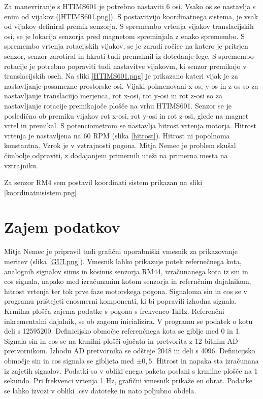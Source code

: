 Za manevriranje s HTIMS601 je potrebno nastaviti 6 osi.
Vsako os se nastavlja s enim od vijakov (\ref{HTIMS601.png}).
S postavitvijo koordinatnega sistema, je vsak od vijakov definiral premik senzorja. 
S spremembo vrtenja vijakov translacijskih osi, se je lokacija senzorja pred magnetom spreminjala z enako spremembo. S spremembo vrtenja rotacijskih vijakov, se je zaradi ročice na katero je pritrjen senzor, senzor zarotiral in hkrati tudi premaknil iz dotedanje lege. S spremembo rotacije je potrebno popraviti tudi nastavitve vijakovm, ki senzor premikajo v translacijskih oseh.
Na sliki \ref{HTIMS601.png} je prikazano kateri vijak je za nastavljanje posamezne prostorske osi. Vijaki poimenovani x-os, y-os in z-os so za nastavljanje translaciijo merjenca, rot x-osi, rot y-osi in rot z-osi so za nastavljanje rotacije premikajoče plošče na vrhu HTIMS601.
Senzor se je posledično ob premiku vijakov rot x-osi, rot y-osi in rot z-osi, glede na magnet vrtel in premikal.
S potenciometrom se nastavlja hitrost vrtenja motorja.
Hitrost vrtenja je nastavljena na 60 RPM (slika \ref{hitrost}). Hitrost ni popolnoma konstantna. Vzrok je v vztrajnosti pogona. Mitja Nemec je problem skušal čimbolje odpraviti, z dodajanjem primernih uteži na primerna mesta na vztrajniku.

Za senzor RM4 sem postavil koordinati sistem prikazan na sliki \ref{koordinatnisistem.png}
 

\newpage
\section{Zajem podatkov}

Mitja Nemec je pripravil tudi grafični uporabniški vmesnik za prikazovanje meritev (slika \ref{GUI.png}).
Vmesnik lahko prikazuje potek refernečnega kota, analognih signalov sinus in kosinus senzorja RM44, izračunanega kota iz sin in cos signala, napako med izračunanim kotom senzorja in refernčnim dajalnikom, hitrost vrtenja ter tok prve faze motorskega pogona. Signaloma sin in cos se v programu prištejeti enosmerni komponenti, ki bi popravili izhodna signala.
Krmilna plošča zajema podatke s pogona s frekvenco 1kHz.
Referenčni inkrementalni dajalnik, se ob zagonu inicializira. V programu se podatek o kotu deli s 12595200. Definicijsko območje referenčnega kota se giblje med 0 in 1.
Signala sin in cos se na krmilni plošči ojačata in pretvorita z 12 bitnim AD pretvornikom. Izhodu AD pretvornika se odšteje 2048 in deli s 4096. Definicijsko območje sin in cos signala se gibljeta med $\pm0,5$.
Hitrost in napaka sta izračunana iz zajetih signalov.
Podatki so v obliki enega paketa poslani s krmilne plošče na 1 sekundo. Pri frekvenci vrtenja 1 Hz, grafični vmesnik prikaže en obrat.
Podatke se lahko izvozi v obliki .csv datoteke in nato poljubno obdela.

